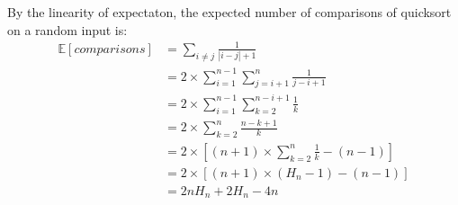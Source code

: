 By the linearity of expectaton, the expected number of comparisons of quicksort on a random input is:\\
\begin{align}
	\mathbb{E}[comparisons] &= \sum_{i \neq j} \frac{1}{|i - j| + 1}\\
							&= 2 \times \sum_{i = 1}^{n - 1} \sum_{j = i + 1}^{n} \frac{1}{j - i + 1}\\
							&= 2 \times \sum_{i = 1}^{n - 1} \sum_{k = 2}^{n - i + 1} \frac{1}{k}\\
							&= 2 \times \sum_{k = 2}^{n} \frac{n - k + 1}{k}\\
							&= 2 \times [(n + 1) \times \sum_{k = 2}^{n} \frac{1}{k} - (n - 1)]\\
							&= 2 \times [(n + 1) \times (H_n - 1) - (n - 1)]\\
							&= 2nH_n + 2H_n - 4n
\end{align}